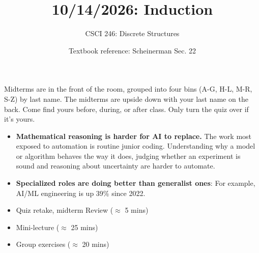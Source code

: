 \documentclass[10pt]{beamer}
\begin{document}






\title{10/14/2026: Induction}
\author{CSCI 246: Discrete Structures}
\date{Textbook reference: Scheinerman Sec. 22}

\begin{frame}
    \titlepage 
\end{frame}


\begin{frame}
\footnotesize 

\begin{mygreenbox}[title=Midterm Pickup]
Midterms are in the front of the room, grouped into four bins (A-G, H-L, M-R, S-Z) by last name. The midterms are upside down with your last name on the back. Come find yours before, during, or after class.  Only turn the quiz over if it's yours.
\end{mygreenbox} 
\vfill 
\begin{myredbox}[title=\text{Motivation: This course and the current job market}]
\begin{itemize}
\item \textbf{Mathematical reasoning is harder for AI to replace. } The work most exposed to automation is routine junior coding. Understanding why a model or algorithm behaves the way it does, judging whether an experiment is sound and reasoning about uncertainty are harder to automate. 
\item \textbf{Specialized roles are doing better than generalist ones}: For example, AI/ML engineering is up 39\% since 2022.
\end{itemize}
\end{myredbox}


\begin{myyellowbox}[title=Today's Agenda]
\begin{itemize}
	\item Quiz retake, midterm Review  ($\approx$ 5 mins)
	\item Mini-lecture ($\approx$ 25 mins)
	\item Group exercises ($\approx$ 20 mins)
\end{itemize}
\end{myyellowbox}
\vfill 

\end{frame}
\end{document}
